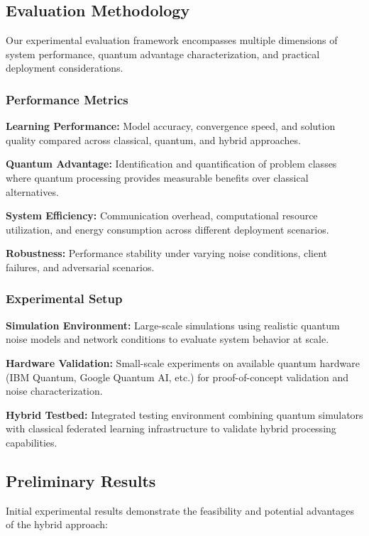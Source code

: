 \documentclass[10pt,journal,compsoc]{IEEEtran}
\begin{document}
\subsection{Evaluation Methodology}

Our experimental evaluation framework encompasses multiple dimensions of system performance, quantum advantage characterization, and practical deployment considerations.

\subsubsection{Performance Metrics}

\textbf{Learning Performance:} Model accuracy, convergence speed, and solution quality compared across classical, quantum, and hybrid approaches.

\textbf{Quantum Advantage:} Identification and quantification of problem classes where quantum processing provides measurable benefits over classical alternatives.

\textbf{System Efficiency:} Communication overhead, computational resource utilization, and energy consumption across different deployment scenarios.

\textbf{Robustness:} Performance stability under varying noise conditions, client failures, and adversarial scenarios.

\subsubsection{Experimental Setup}

\textbf{Simulation Environment:} Large-scale simulations using realistic quantum noise models and network conditions to evaluate system behavior at scale.

\textbf{Hardware Validation:} Small-scale experiments on available quantum hardware (IBM Quantum, Google Quantum AI, etc.) for proof-of-concept validation and noise characterization.

\textbf{Hybrid Testbed:} Integrated testing environment combining quantum simulators with classical federated learning infrastructure to validate hybrid processing capabilities.

\subsection{Preliminary Results}

Initial experimental results demonstrate the feasibility and potential advantages of the hybrid approach:
\end{document}
